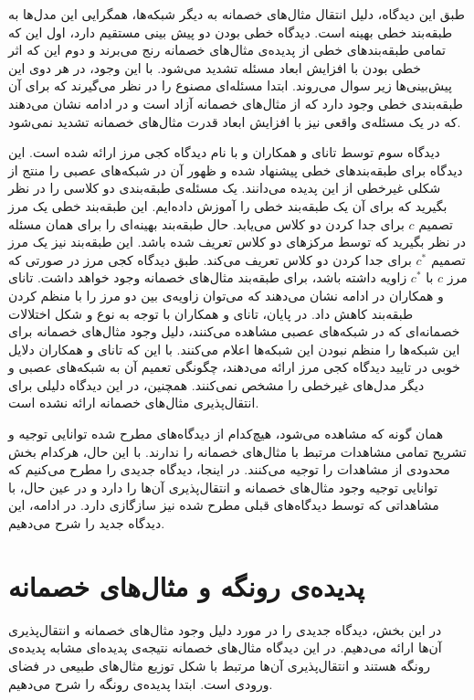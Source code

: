 \documentclass[12pt,onecolumn,a4paper]{article}
\begin{document}
طبق این دیدگاه، دلیل انتقال مثال‌های خصمانه به دیگر شبکه‌ها، همگرایی این مدل‌ها به طبقه‌بند خطی بهینه است. دیدگاه خطی بودن دو پیش بینی مستقیم دارد، اول این که تمامی طبقه‌بندهای خطی از پدیده‌ی مثال‌های خصمانه رنج می‌برند و دوم این که اثر خطی بودن با افزایش ابعاد مسئله تشدید می‌شود. با این وجود، در
\cite{tanay2016boundary}
هر دوی این پیش‌بینی‌ها زیر سوال می‌روند. ابتدا مسئله‌ای  مصنوع را در نظر می‌گیرند که برای آن طبقه‌بندی خطی وجود دارد که از مثال‌های خصمانه آزاد است و در ادامه نشان می‌دهند که در یک مسئله‌ی واقعی نیز با افزایش ابعاد قدرت مثال‌های خصمانه تشدید نمی‌شود.

دیدگاه سوم توسط تانای و همکاران
\cite{tanay2016boundary}
 و با نام دیدگاه کجی مرز ارائه شده است. این دیدگاه برای طبقه‌بندهای خطی پیشنهاد شده و ظهور آن در شبکه‌های عصبی را منتج از شکلی غیرخطی از این پدیده می‌دانند. یک مسئله‌ی طبقه‌بندی دو کلاسی را در نظر بگیرید که برای آن یک طبقه‌بند خطی را آموزش داده‌ایم. این طبقه‌بند خطی یک مرز تصمیم
 $c$
 برای جدا کردن دو کلاس می‌یابد. حال طبقه‌بند بهینه‌ای را برای همان مسئله در نظر بگیرید که توسط مرکزهای دو کلاس تعریف شده باشد. این طبقه‌بند نیز یک مرز تصمیم
 $c^*$
 برای جدا کردن دو کلاس تعریف می‌کند. طبق دیدگاه کجی مرز در صورتی که مرز
 $c$
 با
 $c^*$
 زاویه داشته باشد، برای طبقه‌بند مثال‌های خصمانه وجود خواهد داشت. تانای و همکاران در ادامه نشان می‌دهند که می‌توان زاویه‌ی بین دو مرز را با منظم کردن
طبقه‌بند کاهش داد. در پایان، تانای و همکاران با توجه به نوع و شکل اختلالات خصمانه‌ای که در شبکه‌های عصبی مشاهده می‌کنند، دلیل وجود مثال‌های خصمانه برای این شبکه‌ها را منظم نبودن این شبکه‌ها اعلام می‌کنند. با این که تانای و همکاران دلایل خوبی در تایید دیدگاه کجی مرز ارائه می‌دهند، چگونگی تعمیم آن به شبکه‌های عصبی و دیگر مدل‌های غیرخطی را مشخص نمی‌کنند. همچنین، در این دیدگاه دلیلی برای انتقال‌پذیری مثال‌های خصمانه ارائه نشده است.

همان گونه که مشاهده می‌شود، هیچ‌کدام از دیدگاه‌های مطرح شده توانایی توجیه و تشریح تمامی مشاهدات مرتبط با مثال‌های خصمانه را ندارند. با این حال، هرکدام بخش محدودی از مشاهدات را توجیه می‌کنند. در اینجا، دیدگاه جدیدی را مطرح می‌کنیم که توانایی توجیه وجود مثال‌های خصمانه و انتقال‌پذیری آن‌ها را دارد و  در عین حال، با مشاهداتی که توسط دیدگاه‌های قبلی مطرح شده نیز سازگازی دارد. در ادامه، این دیدگاه جدید را شرح می‌دهیم.

\section{پدیده‌ی رونگه و مثال‌های خصمانه}
در این بخش، دیدگاه جدیدی را در مورد دلیل وجود مثال‌های خصمانه و انتقال‌پذیری آن‌ها ارائه می‌دهیم. در این دیدگاه مثال‌های خصمانه نتیجه‌ی پدیده‌ای مشابه پدیده‌ی رونگه هستند و انتقال‌پذیری آن‌ها مرتبط با شکل توزیع مثال‌های طبیعی در فضای ورودی است. ابتدا پدیده‌ی رونگه را شرح می‌دهیم.
\end{document}

